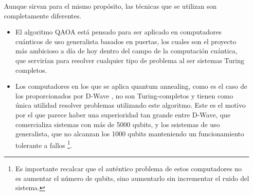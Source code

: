 Aunque sirvan para el mismo propósito, las técnicas que se utilizan son completamente diferentes.
\begin{itemize}
\item El algoritmo QAOA está pensado para ser aplicado en computadores cuánticos de uso generalista basados en puertas, los cuales son el proyecto más ambicioso a día de hoy dentro del campo de la computación cuántica, que servirían para resolver cualquier tipo de problema al ser sistemas Turing completos. 
\item Los computadores en los que se aplica quantum annealing, como es el caso de los proporcionados por D-Wave  %
  , no son Turing-completos y tienen como única utilidad resolver problemas utilizando este algoritmo. Este es el motivo por el que parece haber una superioridad tan grande entre D-Wave, que comercializa sistemas con más de 5000 qubits, y los ssistemas de uso generalista, que no alcanzan los 1000 qubits manteniendo un funcionamiento tolerante a fallos \footnote{Es importante recalcar que el auténtico problema de estos computadores no es aumentar el número de qubits, sino aumentarlo sin incrementar el ruido del sistema.}.
\end{itemize}